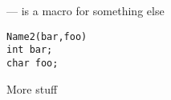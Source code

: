 \startmanpage
{}
--- is a macro for something else 
\startvb\begin{verbatim}
Name2(bar,foo)
int bar;
char foo;
\end{verbatim}
\endvb
More stuff
\endmanpage
